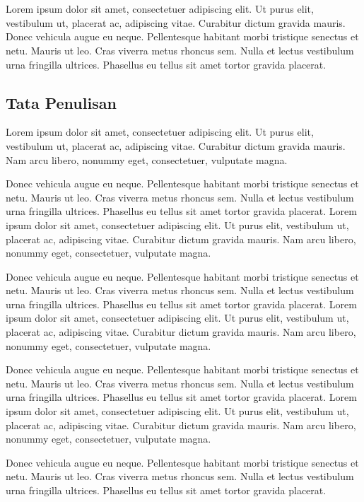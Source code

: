 \chapter{\babDua}
Lorem ipsum dolor sit amet, consectetuer adipiscing elit.
Ut purus elit, vestibulum ut, placerat ac, adipiscing vitae.
Curabitur dictum gravida mauris.
Donec vehicula augue eu neque.
Pellentesque habitant morbi tristique senectus et netu.
Mauris ut leo.  Cras viverra metus rhoncus sem.
Nulla et lectus vestibulum urna fringilla ultrices.
Phasellus eu tellus sit amet tortor gravida placerat.


\section{Tata Penulisan}
Lorem ipsum dolor sit amet, consectetuer adipiscing elit.
Ut purus elit, vestibulum ut, placerat ac, adipiscing vitae.
Curabitur dictum gravida mauris.
Nam arcu libero, nonummy eget, consectetuer, vulputate magna.

Donec vehicula augue eu neque.
Pellentesque habitant morbi tristique senectus et netu.
Mauris ut leo.  Cras viverra metus rhoncus sem.
Nulla et lectus vestibulum urna fringilla ultrices.
Phasellus eu tellus sit amet tortor gravida placerat.
Lorem ipsum dolor sit amet, consectetuer adipiscing elit.
Ut purus elit, vestibulum ut, placerat ac, adipiscing vitae.
Curabitur dictum gravida mauris.
Nam arcu libero, nonummy eget, consectetuer, vulputate magna.

Donec vehicula augue eu neque.
Pellentesque habitant morbi tristique senectus et netu.
Mauris ut leo.  Cras viverra metus rhoncus sem.
Nulla et lectus vestibulum urna fringilla ultrices.
Phasellus eu tellus sit amet tortor gravida placerat.
Lorem ipsum dolor sit amet, consectetuer adipiscing elit.
Ut purus elit, vestibulum ut, placerat ac, adipiscing vitae.
Curabitur dictum gravida mauris.
Nam arcu libero, nonummy eget, consectetuer, vulputate magna.

Donec vehicula augue eu neque.
Pellentesque habitant morbi tristique senectus et netu.
Mauris ut leo.  Cras viverra metus rhoncus sem.
Nulla et lectus vestibulum urna fringilla ultrices.
Phasellus eu tellus sit amet tortor gravida placerat.
Lorem ipsum dolor sit amet, consectetuer adipiscing elit.
Ut purus elit, vestibulum ut, placerat ac, adipiscing vitae.
Curabitur dictum gravida mauris.
Nam arcu libero, nonummy eget, consectetuer, vulputate magna.

Donec vehicula augue eu neque.
Pellentesque habitant morbi tristique senectus et netu.
Mauris ut leo.  Cras viverra metus rhoncus sem.
Nulla et lectus vestibulum urna fringilla ultrices.
Phasellus eu tellus sit amet tortor gravida placerat.